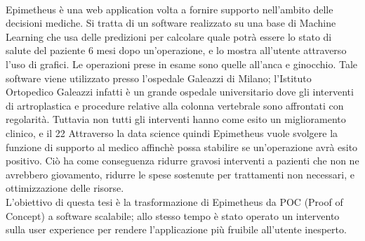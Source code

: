 \\
Epimetheus è una web application volta a fornire supporto nell'ambito delle decisioni mediche. Si tratta di un software realizzato su una base di Machine Learning che usa delle  predizioni per calcolare quale potrà essere lo stato di salute del paziente 6 mesi dopo un'operazione, e lo mostra all'utente attraverso l'uso di grafici. Le operazioni prese in esame sono quelle all'anca e ginocchio. Tale software viene utilizzato presso l'ospedale Galeazzi di Milano; l'Istituto Ortopedico Galeazzi infatti è un grande ospedale universitario dove gli interventi di artroplastica e procedure relative alla colonna vertebrale sono affrontati con regolarità. Tuttavia non tutti gli interventi hanno come esito un miglioramento clinico, e il 22%
Attraverso la data science quindi Epimetheus vuole svolgere la funzione di supporto al medico affinchè possa stabilire se un'operazione avrà esito positivo. Ciò ha come conseguenza ridurre gravosi interventi a pazienti che non ne avrebbero giovamento, ridurre le spese sostenute per trattamenti non necessari, e ottimizzazione delle risorse. 
\\
L'obiettivo di questa tesi è la trasformazione di Epimetheus da POC (Proof of Concept) a software scalabile; allo stesso tempo è stato operato un intervento sulla user experience per rendere l'applicazione più fruibile all'utente inesperto.


